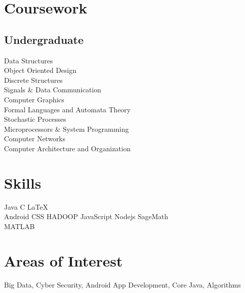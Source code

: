 \documentclass[]{deedy-resume-openfont}
\begin{document}
\begin{minipage}[t]{0.33\textwidth}
\section{Coursework}


\subsection{Undergraduate}

Data Structures \\
Object Oriented Design \\
Discrete Structures \\
Signals \& Data Communication \\
Computer Graphics \\
Formal Languages and Automata Theory\\
Stochastic Processes\\
Microprocessors \& System Programming\\
Computer Networks\\
Computer Architecture and Organization

\sectionsep


\section{Skills}
Java \textbullet{}   C \textbullet{} \LaTeX{}   \\ 
Android \textbullet{} CSS \textbullet{}HADOOP \textbullet{}JavaScript \textbullet{}Nodejs \textbullet{} SageMath\\
MATLAB 

\section{Areas of Interest}
 Big Data, Cyber Security, Android App Development, Core Java, Algorithms

%
%

\end{minipage} 
\hfill
\end{document}

